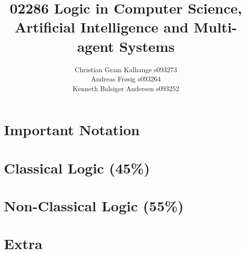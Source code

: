 \documentclass[a4paper,11pt]{article}
\title{02286 Logic in Computer Science, Artificial Intelligence and Multi-agent Systems }
\author{
Christian Gram Kalhauge s093273 \\
Andreas Frøsig s093264 \\
Kenneth Balsiger Andersen s093252
}
\begin{document}
\maketitle

\part{Important Notation}



\part{Classical Logic (45\%)}




\part{Non-Classical Logic (55\%)}


\part{Extra}

\printindex


\nocite{*}



\end{document}
